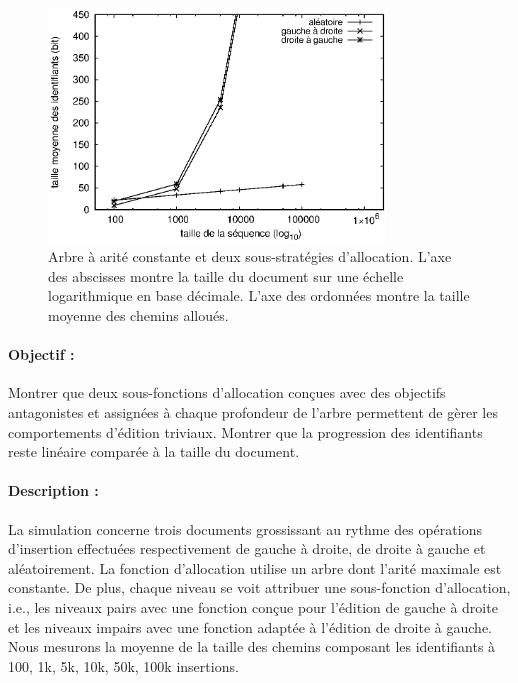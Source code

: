 \begin{figure}
  \begin{center}
    \includegraphics[width=0.8\textwidth]{img/lseq/robin.eps}
    \caption[Influence de deux sous-fonctions d'allocations sur la taille des
    chemins] {\label{repl:img:suballocation} Arbre à arité constante et deux
      sous-stratégies d'allocation. L'axe des abscisses montre la taille du
      document sur une échelle logarithmique en base décimale. L'axe des
      ordonnées montre la taille moyenne des chemins alloués.}
  \end{center}
\end{figure}

\paragraph{Objectif :} Montrer que deux sous-fonctions d'allocation conçues avec
des objectifs antagonistes et assignées à chaque profondeur de l'arbre
permettent de gèrer les comportements d'édition triviaux. Montrer que la
progression des identifiants reste linéaire comparée à la taille du document.

\paragraph{Description :} La simulation concerne trois documents grossissant au
rythme des opérations d'insertion effectuées respectivement de gauche à droite,
de droite à gauche et aléatoirement. La fonction d'allocation utilise un arbre
dont l'arité maximale est constante. De plus, chaque niveau se voit attribuer
une sous-fonction d'allocation, i.e., les niveaux pairs avec une fonction conçue
pour l'édition de gauche à droite et les niveaux impairs avec une fonction
adaptée à l'édition de droite à gauche. Nous mesurons la moyenne de la taille
des chemins composant les identifiants à 100, 1k, 5k, 10k, 50k, 100k insertions.

